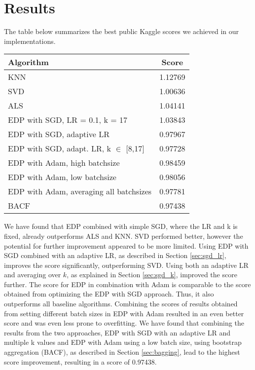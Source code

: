 \section{Results}
\label{sec:results}

The table below summarizes the best public Kaggle scores we achieved in our implementations.

\begin{center}
 \begin{tabular}{| l | c|} 
 \hline
  Algorithm & Score \\ [0.5ex] 
 \hline\hline
 \ac{KNN} & 1.12769 \\ 
 \hline
 \ac{SVD} & 1.00636 \\
 \hline
 \ac{ALS} & 1.04141 \\
 \hline
 \ac{EDP} with \ac{SGD}, LR = 0.1, k = 17 & 1.03843 \\
 \hline
 \ac{EDP} with \ac{SGD}, adaptive LR & 0.97967 \\
 \hline
 \ac{EDP} with \ac{SGD}, adapt. LR, k $\in$ [8,17] & 0.97728 \\
 \hline
 \ac{EDP} with Adam, high batchsize & 0.98459 \\
 \hline
 \ac{EDP} with Adam, low batchsize & 0.98056 \\
 \hline
 \ac{EDP} with Adam, averaging all batchsizes & 0.97781 \\
 \hline
 
 BACF & 0.97438 \\
 \hline
\end{tabular}
\end{center}

We have found that \ac{EDP} combined with simple \ac{SGD}, where the \ac{LR} and k is fixed, already outperforms \ac{ALS} and \ac{KNN}. SVD performed better, however the potential for further improvement appeared to be more limited. Using EDP with SGD combined with an adaptive \ac{LR}, as described in Section \ref{sec:sgd_lr}, improves the score significantly, outperforming SVD. Using both an adaptive \ac{LR} and averaging over $k$, as explained in Section \ref{sec:sgd_k}, improved the score further.
The score for \ac{EDP} in combination with Adam is comparable to the score obtained from optimizing the \ac{EDP} with \ac{SGD} approach. Thus, it also outperforms all baseline algorithms. 
Combining the scores of results obtained from setting different batch sizes in \ac{EDP} with Adam resulted in an even better score and was even less prone to overfitting.
We have found that combining the results from the two approaches, EDP with SGD with an adaptive \ac{LR} and multiple k values and EDP with Adam using a low batch size, using bootstrap aggregation (BACF), as described in Section \ref{sec:bagging}, lead to the highest score improvement, resulting in a score of 0.97438.
